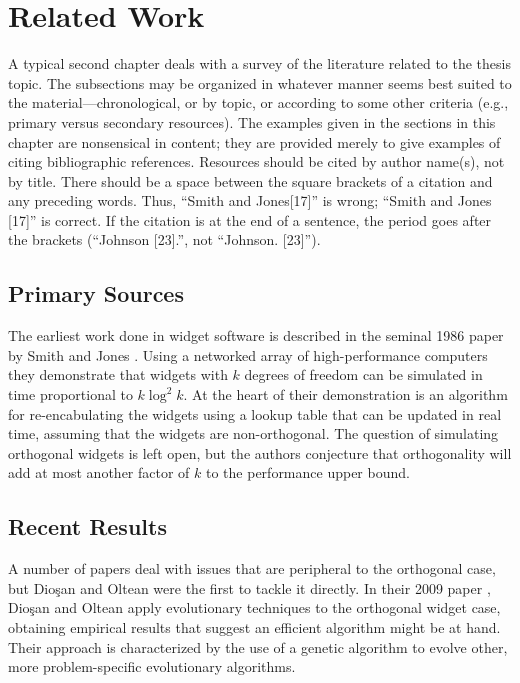 %
%
\chapter{Related Work}\label{ch:relatedwork}

A typical second chapter deals with a survey of the literature
related to the thesis topic. The subsections may be organized in whatever
manner seems best suited to the material---chronological, or by topic, or
according to some other criteria (e.g., primary versus secondary resources).
The examples given in the sections in this chapter are nonsensical in content;
they are provided merely to give examples of citing bibliographic references.
Resources should be cited by author name(s), not by title.
There should be a space between the square brackets of a citation and
any preceding words. Thus, ``Smith and Jones[17]'' is wrong; ``Smith and
Jones [17]'' is correct. If the citation is at the end of a sentence, the
period goes after the brackets (``Johnson [23].'', not ``Johnson. [23]'').

\section{Primary Sources}
The earliest work done in widget software is described in the seminal 1986
paper by Smith and Jones . Using a networked array of
high-performance computers they demonstrate that widgets with $k$ degrees
of freedom can be simulated in time proportional to $k\log^2k$. At the
heart of their demonstration is an algorithm for re-encabulating the widgets
using a lookup table that can be updated in real time, assuming that
the widgets are non-orthogonal. The question of simulating orthogonal widgets
is left open, but the authors conjecture that orthogonality will add at
most another factor of $k$ to the performance upper bound.


\section{Recent Results}
A number of papers deal with issues
that are peripheral to the orthogonal case, but Dio\c{s}an and Oltean
were the first to tackle it directly.
In their 2009 paper , 
Dio\c{s}an and Oltean apply evolutionary techniques to
the orthogonal widget case, obtaining empirical results that suggest
an efficient algorithm might be at hand. Their
approach is characterized by the use of a genetic algorithm to evolve other,
more problem-specific evolutionary algorithms. 

